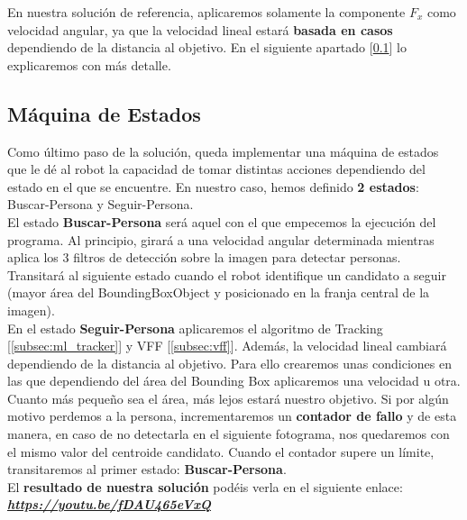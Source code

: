 En nuestra solución de referencia, aplicaremos solamente la componente $F_x$ como velocidad angular, ya que la velocidad lineal estará \textbf{basada en casos} dependiendo de la distancia al objetivo. En el siguiente apartado [\ref{subsec:maquina_estados}] lo explicaremos con más detalle.

\subsection{Máquina de Estados}
\label{subsec:maquina_estados}

Como último paso de la solución, queda implementar una máquina de estados que le dé al robot la capacidad de tomar distintas acciones dependiendo del estado en el que se encuentre. En nuestro caso, hemos definido \textbf{2 estados}: Buscar-Persona y Seguir-Persona.\\

El estado \textbf{Buscar-Persona} será aquel con el que empecemos la ejecución del programa. Al principio, girará a una velocidad angular determinada mientras aplica los 3 filtros de detección sobre la imagen para detectar personas. Transitará al siguiente estado cuando el robot identifique un candidato a seguir (mayor área del BoundingBoxObject y posicionado en la franja central de la imagen).\\

En el estado \textbf{Seguir-Persona} aplicaremos el algoritmo de Tracking [\ref{subsec:ml_tracker}] y VFF [\ref{subsec:vff}]. Además, la velocidad lineal cambiará dependiendo de la distancia al objetivo. Para ello crearemos unas condiciones en las que dependiendo del área del Bounding Box aplicaremos una velocidad u otra. Cuanto más pequeño sea el área, más lejos estará nuestro objetivo. Si por algún motivo perdemos a la persona, incrementaremos un \textbf{contador de fallo} y de esta manera, en caso de no detectarla en el siguiente fotograma, nos quedaremos con el mismo valor del centroide candidato. Cuando el contador supere un límite, transitaremos al primer estado: \textbf{Buscar-Persona}.\\

El \textbf{resultado de nuestra solución} podéis verla en el siguiente enlace: \textbf{\textit{\url{https://youtu.be/fDAU465eVxQ}}}

